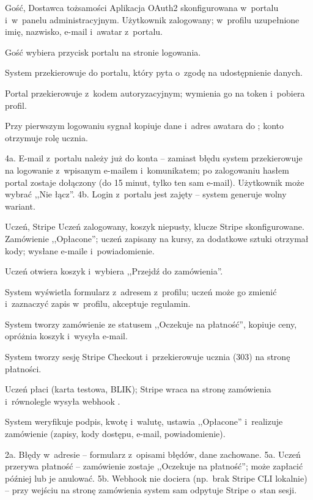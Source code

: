 {Gość, Dostawca tożsamości}
{Aplikacja OAuth2 skonfigurowana w~portalu i~w~panelu administracyjnym.}
{Użytkownik zalogowany; w~profilu uzupełnione imię, nazwisko, e-mail i~awatar z~portalu.}
{\item Gość wybiera przycisk portalu na stronie logowania.
 \item System przekierowuje do portalu, który pyta o~zgodę na udostępnienie danych.
 \item Portal przekierowuje z~kodem autoryzacyjnym;  wymienia go na token i~pobiera profil.
 \item Przy pierwszym logowaniu sygnał kopiuje dane i~adres awatara do ; konto otrzymuje rolę ucznia.}
{4a. E-mail z~portalu należy już do konta -- zamiast błędu system przekierowuje na logowanie z~wpisanym e-mailem i~komunikatem; po zalogowaniu hasłem portal zostaje dołączony (do 15 minut, tylko ten sam e-mail). Użytkownik może wybrać ,,Nie łącz''.\newline
4b. Login z~portalu jest zajęty -- system generuje wolny wariant.}

{Uczeń, Stripe}
{Uczeń zalogowany, koszyk niepusty, klucze Stripe skonfigurowane.}
{Zamówienie ,,Opłacone''; uczeń zapisany na kursy, za dodatkowe sztuki otrzymał kody; wysłane e-maile i~powiadomienie.}
{\item Uczeń otwiera koszyk i~wybiera ,,Przejdź do zamówienia''.
 \item System wyświetla formularz z~adresem z~profilu; uczeń może go zmienić i~zaznaczyć zapis w~profilu, akceptuje regulamin.
 \item System tworzy zamówienie ze statusem ,,Oczekuje na płatność'', kopiuje ceny, opróżnia koszyk i~wysyła e-mail.
 \item System tworzy sesję Stripe Checkout i~przekierowuje ucznia (303) na stronę płatności.
 \item Uczeń płaci (karta testowa, BLIK); Stripe wraca na stronę zamówienia i~równolegle wysyła webhook .
 \item System weryfikuje podpis, kwotę i~walutę, ustawia ,,Opłacone'' i~realizuje zamówienie (zapisy, kody dostępu, e-mail, powiadomienie).}
{2a. Błędy w~adresie -- formularz z~opisami błędów, dane zachowane.\newline
5a. Uczeń przerywa płatność -- zamówienie zostaje ,,Oczekuje na płatność''; może zapłacić później lub je anulować.\newline
5b. Webhook nie dociera (np.\ brak Stripe CLI lokalnie) -- przy wejściu na stronę zamówienia system sam odpytuje Stripe o~stan sesji.}


